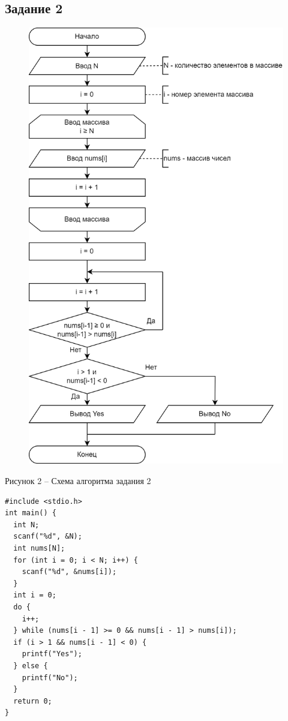 \documentclass[a4paper,14pt]{extarticle}
\begin{document}
  \subsection*{Задание 2}
  \begin{figure}[h]
    \centering
    \includegraphics[width=0.5\linewidth]{schemes/s-2}
  \end{figure}
  \begin{center}
    Рисунок 2 – Схема алгоритма задания 2
  \end{center}
  \begin{lstlisting}[tabsize=2,basicstyle=\ttfamily]
#include <stdio.h>
int main() {
  int N;
  scanf("%d", &N);
  int nums[N];
  for (int i = 0; i < N; i++) {
    scanf("%d", &nums[i]);
  }
  int i = 0;
  do {
    i++;
  } while (nums[i - 1] >= 0 && nums[i - 1] > nums[i]);
  if (i > 1 && nums[i - 1] < 0) {
    printf("Yes");
  } else {
    printf("No");
  }
  return 0;
}
  \end{lstlisting}

  \newpage
\end{document}
